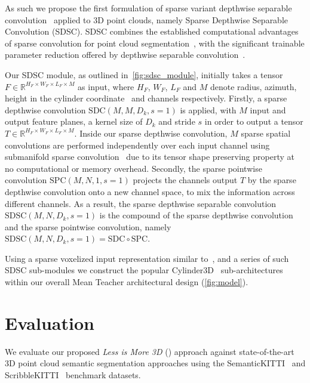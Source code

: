 \documentclass[10pt,twocolumn,letterpaper]{article}
\begin{document}
As such we propose the first formulation of sparse variant depthwise separable convolution~\cite{howard2017mobilenets} applied to 3D point clouds, namely Sparse Depthwise Separable Convolution (SDSC). SDSC combines the established computational advantages of sparse convolution for point cloud segmentation~\cite{graham20183d}, with the significant trainable parameter reduction offered by depthwise separable convolution~\cite{chollet2017xception}. 


Our SDSC module, as outlined in~\cref{fig:sdsc_module}, initially takes a tensor $F \in \mathbb{R} ^{H_F \times W_F \times L_F \times M}$ as input, where $H_F$, $W_F$, $L_F$ and $M$ denote radius, azimuth, height in the cylinder coordinate~\cite{zhu2021cylindrical} and channels respectively. Firstly, a sparse depthwise convolution $\text{SDC}(M,M,D_k,s=1)$ is applied, with $M$ input and output feature planes, a kernel size of $D_k$ and stride $s$ in order to output a tensor $T \in \mathbb{R} ^{H_F \times W_F \times L_F \times M}$. Inside our sparse depthwise convolution, $M$ sparse spatial convolutions are performed independently over each input channel using submanifold sparse convolution~\cite{graham20183d} due to its tensor shape preserving property at no computational or memory overhead. Secondly, the sparse pointwise convolution $\text{SPC}(M,N,1,s=1)$ projects the channels output $T$ by the sparse depthwise convolution onto a new channel space, to mix the information across different channels. As a result, the sparse depthwise separable convolution $\text{SDSC}(M,N,D_k,s=1)$ is the compound of the sparse depthwise convolution and the sparse pointwise convolution, namely $\text{SDSC}(M,N,D_k,s=1)=\text{SDC}\circ \text{SPC}$.

Using a sparse voxelized input representation similar to~\cite{graham2015sparse}, and a series of such SDSC sub-modules we construct the popular Cylinder3D~\cite{zhu2021cylindrical} sub-architectures within our overall Mean Teacher architectural design (\cref{fig:model}).  \vspace{-0.3cm}   
\section{Evaluation}
\label{sec:experiments}
\noindent
We evaluate our proposed \textit{Less is More 3D} ({\ourmodel}) approach against state-of-the-art 3D point cloud semantic segmentation approaches using the SemanticKITTI~\cite{behley2019semantickittia} and ScribbleKITTI~\cite{Unal_2022_CVPR} benchmark datasets.
\end{document}
